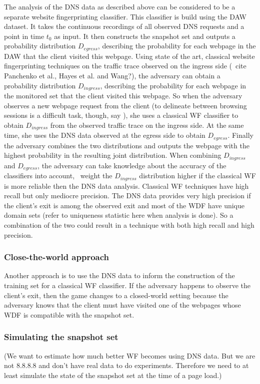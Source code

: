 The analysis of the DNS data as described above can be considered to be
a separate website fingerprinting classifier. This classifier is build
using the DAW dataset. It takes the continuous recordings of all
observed DNS requests and a point in time $t_0$ as input. It then
constructs the snapshot set and outputs a probability distribution
$D_{egress}$, describing the probability for each webpage in the DAW
that the client visited this webpage.
%
Using state of the art, classical website fingerprinting techniques on
the traffic trace observed on the ingress side (\eg~cite Panchenko et al.,
Hayes et al. and Wang?), the adversary can obtain a probability distribution
$D_{ingress}$, describing the probability for each webpage in the
monitored set that the client visited this webpage.
%
So when the adversary observes a new webpage request from the client
(to delineate between browsing sessions is a difficult task, though, say
\cite{Coull2007a}), she uses a classical WF classifier to obtain $D_{ingress}$
from the observed traffic trace on the ingress side. At the same time,
she uses the DNS data observed at the egress side to obtain $D_{egress}$.
%
Finally the adversary combines the two distributions and outputs the
webpage with the highest probability in the resulting joint distribution.
%
When combining $D_{ingress}$ and $D_{egress}$, the adversary can take
knowledge about the accuracy of the classifiers into account, \eg~weight
the $D_{ingress}$ distribution higher if the classical WF is more reliable
then the DNS data analysis.
%
Classical WF techniques have high recall but only mediocre precision.
The DNS data provides very high precision if the client's exit is among
the observed exit and most of the WDF have unique domain sets (refer to
uniqueness statistic here when analysis is done). So a combination of
the two could result in a technique with both high recall and high
precision.


\subsubsection{Close-the-world approach}

Another approach is to use the DNS data to inform the construction
of the training set for a classical WF classifier.
%
If the adversary happens to observe the client's exit, then the game
changes to a closed-world setting because the adversary knows that the
client must have visited one of the webpages whose WDF is compatible
with the snapshot set.


\subsubsection{Simulating the snapshot set}
(We want to estimate how much better WF becomes using DNS data. But we
are not 8.8.8.8 and don't have real data to do experiments. Therefore we
need to at least simulate the state of the snapshot set at the time of a
page load.) %
